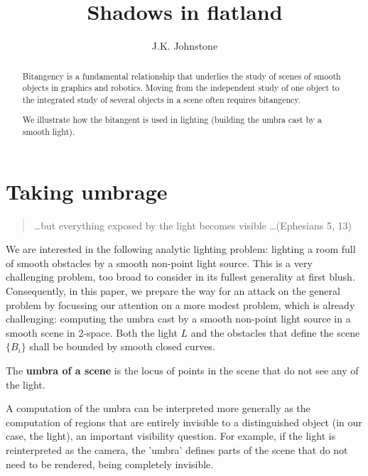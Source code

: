 \documentclass[12pt]{article}
\title{Shadows in flatland}
\author{J.K. Johnstone}
\begin{document}
\maketitle


\begin{abstract}
Bitangency is a fundamental relationship that underlies the study
of scenes of smooth objects in graphics and robotics.
Moving from the independent study of one object to the 
integrated study of several objects in a scene often requires bitangency.

We illustrate how the bitangent is used in 
lighting (building the umbra cast by a smooth light).
\end{abstract}


\section{Taking umbrage}

\begin{quote}
\ldots but everything exposed by the light becomes visible \ldots (Ephesians 5, 13)
\end{quote}

We are interested in the following analytic lighting problem:
lighting a room full of smooth obstacles by a smooth non-point light source.
This is a very challenging problem, too broad to consider in its fullest 
generality at first blush.
Consequently, in this paper, we prepare the way for an attack on the general problem
by focussing our attention on a more modest problem,
which is already challenging:
computing the umbra cast by a smooth non-point light source in a smooth 
scene in 2-space.
Both the light $L$ and the obstacles that define the scene $\{B_i\}$ 
shall be bounded by smooth closed curves.

\begin{defn2}
The {\bf umbra of a scene} is the locus of points in the scene that do not
see any of the light.
\end{defn2}

A computation of the umbra can be interpreted
more generally as the computation of regions that are entirely invisible
to a distinguished object (in our case, the light),
an important visibility question.
For example, if the light is reinterpreted as the camera,
the 'umbra' defines parts of the scene that do not need to be rendered,
being completely invisible.
\end{document}
